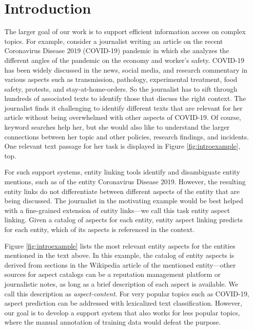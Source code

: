 \section{Introduction}
\label{sec:Introduction}


The larger goal of our work is to support efficient information access on complex topics. 
%
For example, consider a journalist writing an article on the recent Coronavirus Disease 2019 (COVID-19)
pandemic in which she analyzes the different angles of the pandemic on the economy and worker's safety. COVID-19 has been widely discussed in the news, social media, and research commentary in various aspects such as transmission, pathology, experimental treatment, food safety, protests, and stay-at-home-orders. So the journalist has to sift through hundreds of associated texts to identify those that discuss the right context. The journalist finds it challenging to identify different texts that are relevant for her article without being overwhelmed with other aspects of COVID-19. Of course, keyword searches help her, but she would also like to understand the larger connections between her topic and other policies, research findings, and incidents. One relevant text passage for her task is displayed in Figure \ref{fig:introexample}, top. 





For such support systems, entity linking tools \cite{ferragina2010tagme,mendes2011dbpedia,piccinno2014wat} identify and disambiguate entity mentions, such as of the entity Coronavirus Disease 2019. However, the resulting entity links do not differentiate between different aspects of the entity that are being discussed. The journalist in the motivating example would be best helped with a fine-grained extension of entity links---we call this task entity aspect linking. Given a catalog of aspects for each entity, entity aspect linking predicts for each entity, which of its aspects is referenced in the context. 

 Figure \ref{fig:introexample} lists the most relevant entity aspects for the entities mentioned in the text above.  In this example, the catalog of entity aspects is derived from sections in the Wikipedia article of the mentioned entity---other sources for aspect catalogs can be a reputation management platform or journalistic notes, as long as a brief description of each aspect is available. We call this description as \emph{aspect-content}.  
 For very popular topics such as COVID-19, aspect prediction can be addressed with lexicalized text classification. However, our goal is to develop a support system that also works for less popular topics, where the manual annotation of training data would defeat the purpose. 


